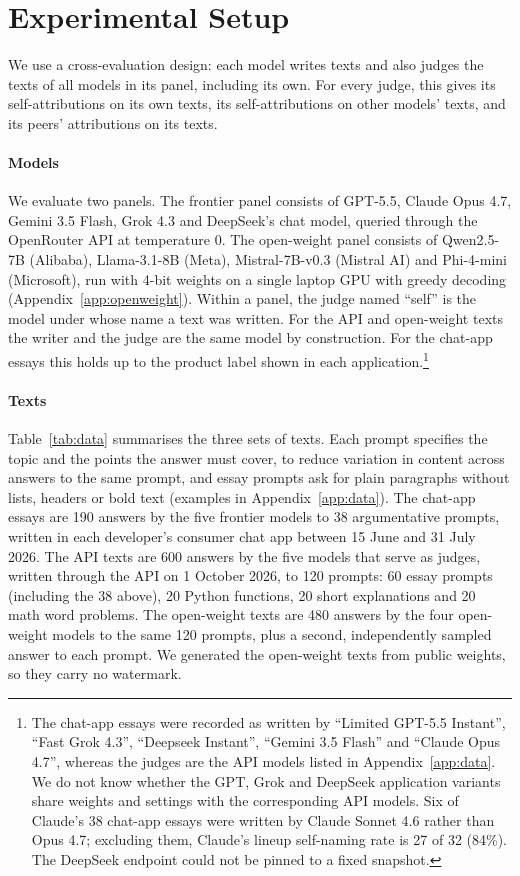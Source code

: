 \section{Experimental Setup}
\label{sec:setup}

We use a cross-evaluation design: each model writes texts and also judges the
texts of all models in its panel, including its own. For every judge, this
gives its self-attributions on its own texts, its self-attributions on other
models' texts, and its peers' attributions on its texts.

\paragraph{Models}
We evaluate two panels. The frontier panel consists of GPT-5.5, Claude Opus
4.7, Gemini 3.5 Flash, Grok 4.3 and DeepSeek's chat model, queried through the
OpenRouter API at temperature 0. The open-weight panel consists of Qwen2.5-7B
(Alibaba), Llama-3.1-8B (Meta), Mistral-7B-v0.3 (Mistral AI) and Phi-4-mini
(Microsoft), run with 4-bit weights on a single laptop GPU with greedy decoding
(Appendix~\ref{app:openweight}). Within a panel, the judge named ``self'' is
the model under whose name a text was written. For the API and open-weight
texts the writer and the judge are the same model by construction. For the chat-app essays this holds up to the
product label shown in each application.\footnote{The chat-app essays were
recorded as written by ``Limited GPT-5.5 Instant'', ``Fast Grok 4.3'',
``Deepseek Instant'', ``Gemini 3.5 Flash'' and ``Claude Opus 4.7'', whereas the
judges are the API models listed in Appendix~\ref{app:data}. We do not know
whether the GPT, Grok and DeepSeek application variants share weights and
settings with the corresponding API models. Six of Claude's 38 chat-app essays
were written by Claude Sonnet 4.6 rather than Opus 4.7; excluding them,
Claude's lineup self-naming rate is 27 of 32 (84\%). The DeepSeek endpoint
could not be pinned to a fixed snapshot.}



\paragraph{Texts}
Table~\ref{tab:data} summarises the three sets of texts. Each prompt specifies
the topic and the points the answer must cover, to reduce variation in content
across answers to the same prompt, and essay prompts ask for plain paragraphs
without lists, headers or bold text (examples in Appendix~\ref{app:data}). The
chat-app essays are 190 answers by the five frontier models to 38 argumentative
prompts, written in each developer's consumer chat app between 15 June and 31
July 2026. The API texts are 600 answers by the five models that serve as
judges, written through the API on 1 October 2026, to 120 prompts: 60 essay prompts (including the 38 above), 20 Python
functions, 20 short explanations and 20 math word problems. The open-weight
texts are 480 answers by the four open-weight models to the same 120 prompts,
plus a second, independently sampled answer to each prompt. We generated the
open-weight texts from public weights, so they carry no watermark.

